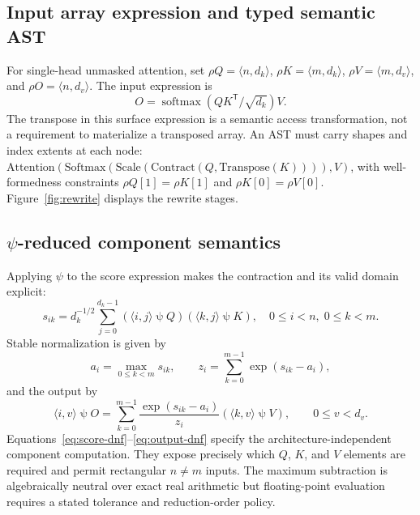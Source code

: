 \documentclass[11pt]{article}
\newcommand{\psisel}{\mathbin{\psi}}
\begin{document}
\subsection{Input array expression and typed semantic AST}
For single-head unmasked attention, set $\rho Q=\langle n,d_k\rangle$, $\rho K=\langle m,d_k\rangle$, $\rho V=\langle m,d_v\rangle$, and $\rho O=\langle n,d_v\rangle$. The input expression is
\begin{equation}
O=\operatorname{softmax}(QK^{\mathsf T}/\sqrt{d_k})V.
\label{eq:surface}
\end{equation}
The transpose in this surface expression is a semantic access transformation, not a requirement to materialize a transposed array. An AST must carry shapes and index extents at each node: $\mathrm{Attention}(\mathrm{Softmax}(\mathrm{Scale}(\mathrm{Contract}(Q,\mathrm{Transpose}(K)))),V)$, with well-formedness constraints $\rho Q[1]=\rho K[1]$ and $\rho K[0]=\rho V[0]$. Figure~\ref{fig:rewrite} displays the rewrite stages.

\subsection{$\psi$-reduced component semantics}
Applying $\psi$ to the score expression makes the contraction and its valid domain explicit:
\begin{equation}
s_{ik}=d_k^{-1/2}\sum_{j=0}^{d_k-1}
(\langle i,j\rangle\psisel Q)(\langle k,j\rangle\psisel K),
\quad 0\le i<n,\;0\le k<m.
\label{eq:score-dnf}
\end{equation}
Stable normalization is given by
\begin{equation}
a_i=\max_{0\le k<m}s_{ik},\qquad
z_i=\sum_{k=0}^{m-1}\exp(s_{ik}-a_i),
\label{eq:stable-dnf}
\end{equation}
and the output by
\begin{equation}
\langle i,v\rangle\psisel O
=\sum_{k=0}^{m-1}\frac{\exp(s_{ik}-a_i)}{z_i}
(\langle k,v\rangle\psisel V),\qquad 0\le v<d_v.
\label{eq:output-dnf}
\end{equation}
Equations~\eqref{eq:score-dnf}--\eqref{eq:output-dnf} specify the architecture-independent component computation. They expose precisely which $Q$, $K$, and $V$ elements are required and permit rectangular $n\ne m$ inputs. The maximum subtraction is algebraically neutral over exact real arithmetic but floating-point evaluation requires a stated tolerance and reduction-order policy.
\end{document}

